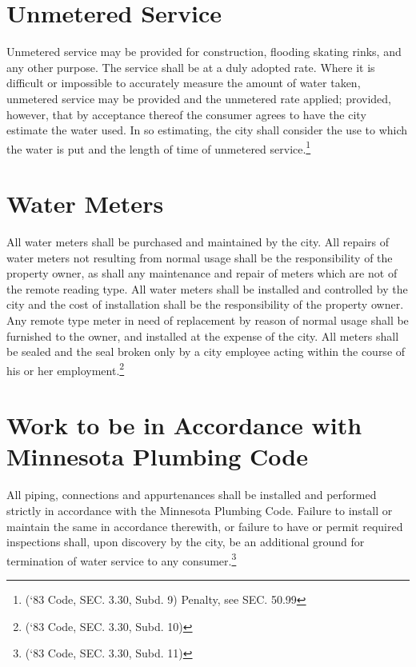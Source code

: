\section{Unmetered Service}
Unmetered service may be provided for construction, flooding skating rinks, and any other purpose.  The service shall be at a duly adopted rate.  Where it is difficult or impossible to accurately measure the amount of water taken, unmetered service may be provided and the unmetered rate applied; provided, however, that by acceptance thereof the consumer agrees to have the city estimate the water used.  In so estimating, the city shall consider the use to which the water is put and the length of time of unmetered service.\footnote{(‘83 Code, SEC. 3.30, Subd. 9) Penalty, see SEC. 50.99}

\section{Water Meters}
All water meters shall be purchased and maintained by the city.  All repairs of water meters not resulting from normal usage shall be the responsibility of the property owner, as shall any maintenance and repair of meters which are not of the remote reading type.  All water meters shall be installed and controlled by the city and the cost of installation shall be the responsibility of the property owner.  Any remote type meter in need of replacement by reason of normal usage shall be furnished to the owner, and installed at the expense of the city.  All meters shall be sealed and the seal broken only by a city employee acting within the course of his or her employment.\footnote{(‘83 Code, SEC. 3.30, Subd. 10)}

\section{Work to be in Accordance with Minnesota Plumbing Code}
All piping, connections and appurtenances shall be installed and performed strictly in accordance with the Minnesota Plumbing Code.  Failure to install or maintain the same in accordance therewith, or failure to have or permit required inspections shall, upon discovery by the city, be an additional ground for termination of water service to any consumer.\footnote{(‘83 Code, SEC. 3.30, Subd. 11)}
